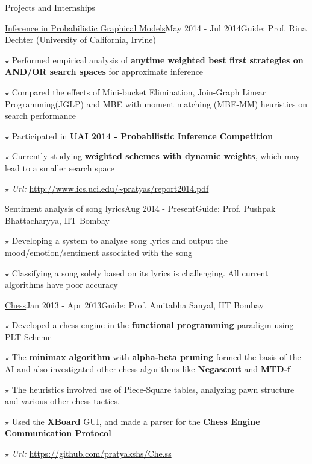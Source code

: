 \documentclass{resume2} %
\begin{document}
\begin{rSection}{Projects and Internships}

\begin{rSubsection}{\href{http://www.ics.uci.edu/~pratyas/report2014.pdf}{Inference in Probabilistic Graphical Models}}{May 2014 - Jul 2014}{Guide: Prof. Rina Dechter (University of California, Irvine)
}{}
\item[$\star$] Performed empirical analysis of \textbf{anytime weighted best first strategies on AND/OR search spaces} for approximate inference 
\item[$\star$] Compared the effects of Mini-bucket Elimination, Join-Graph Linear Programming(JGLP) and MBE with moment matching (MBE-MM) heuristics on search performance
\item[$\star$] Participated in \textbf{UAI 2014 - Probabilistic Inference Competition}
\item[$\star$] Currently studying \textbf{weighted schemes with dynamic weights}, which may lead to a smaller search space
\item[$\star$] \emph{Url:} \url{http://www.ics.uci.edu/~pratyas/report2014.pdf}
\end{rSubsection}


\begin{rSubsection}{Sentiment analysis of song lyrics}{Aug 2014 - Present}{Guide: Prof. Pushpak Bhattacharyya, IIT Bombay}{}
\item[$\star$] Developing a system to analyse song lyrics and output the mood/emotion/sentiment associated with the song
\item[$\star$] Classifying a song solely based on its lyrics is challenging. All current algorithms have poor accuracy
\end{rSubsection}


\begin{rSubsection}{\href{https://github.com/pratyakshs/Che.ss}{Chess}}{Jan 2013 - Apr 2013}{Guide: Prof. Amitabha Sanyal, IIT Bombay}{}
\item[$\star$] Developed a chess engine in the \textbf{functional programming} paradigm using PLT Scheme
\item[$\star$] The \textbf{minimax algorithm} with \textbf{alpha-beta pruning} formed the basis of the AI and also investigated other chess algorithms like \textbf{Negascout} and \textbf{MTD-f} \item[$\star$] The heuristics involved use of Piece-Square tables, analyzing pawn structure and various other chess tactics.
\item[$\star$] Used the \textbf{XBoard} GUI, and made a parser for the \textbf{Chess Engine Communication Protocol}
\item[$\star$] \emph{Url:} \url{https://github.com/pratyakshs/Che.ss}
\end{rSubsection}





\end{rSection}
\end{document}
